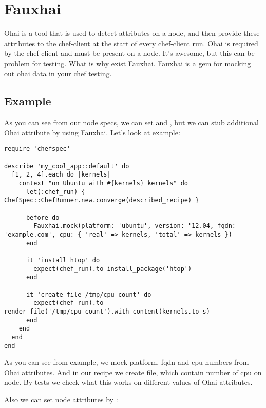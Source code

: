\section{Fauxhai}
\label{sec:testing-fauxhai}

Ohai is a tool that is used to detect attributes on a node, and then provide these attributes to the chef-client at the start of every chef-client run. Ohai is required by the chef-client and must be present on a node. It's awesome, but this can be problem for testing. What is why exist Fauxhai. \href{http://technology.customink.com/fauxhai/}{Fauxhai} is a gem for mocking out ohai data in your chef testing.

\subsection{Example}

As you can see from our node specs, we can set  and , but we can stub additional Ohai attribute by using Fauxhai. Let's look at example:

\begin{lstlisting}[label=lst:testing-fauxhai1]
require 'chefspec'

describe 'my_cool_app::default' do
  [1, 2, 4].each do |kernels|
    context "on Ubuntu with #{kernels} kernels" do
      let(:chef_run) { ChefSpec::ChefRunner.new.converge(described_recipe) }

      before do
        Fauxhai.mock(platform: 'ubuntu', version: '12.04, fqdn: 'example.com', cpu: { 'real' => kernels, 'total' => kernels })
      end

      it 'install htop' do
        expect(chef_run).to install_package('htop')
      end

      it 'create file /tmp/cpu_count' do
        expect(chef_run).to render_file('/tmp/cpu_count').with_content(kernels.to_s)
      end
    end
  end
end
\end{lstlisting}

As you can see from example, we mock platform, fqdn and cpu numbers from Ohai attributes. And in our recipe we create  file, which contain number of cpu on node. By tests we check what this works on different values of Ohai attributes.

Also we can set node attributes by :

